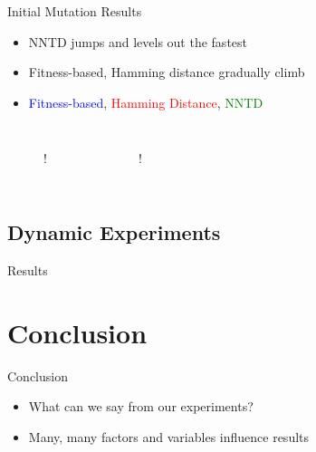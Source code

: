 \begin{frame}{Initial Mutation Results}
  \begin{itemize}
    \item NNTD jumps and levels out the fastest
    \item Fitness-based, Hamming distance gradually climb
    \item \textcolor{blue}{Fitness-based}, \textcolor{red}{Hamming Distance}, \textcolor{green}{NNTD}
  \end{itemize}

  \begin{columns}
    \begin{figure}[t!]
      \centering
      \resizebox{\linewidth} {!} {%
        
      }
    \end{figure}
    \begin{figure}
      \centering
      \resizebox{\linewidth} {!} {%
        
      }
    \end{figure}
  \end{columns}
\end{frame}


\subsection{Dynamic Experiments}

\begin{frame}{Results}

\end{frame}

\section{Conclusion}
\begin{frame}{Conclusion}
  \begin{itemize}
    \item What can we say from our experiments?
    \item Many, many factors and variables influence results
  \end{itemize}
\end{frame}

